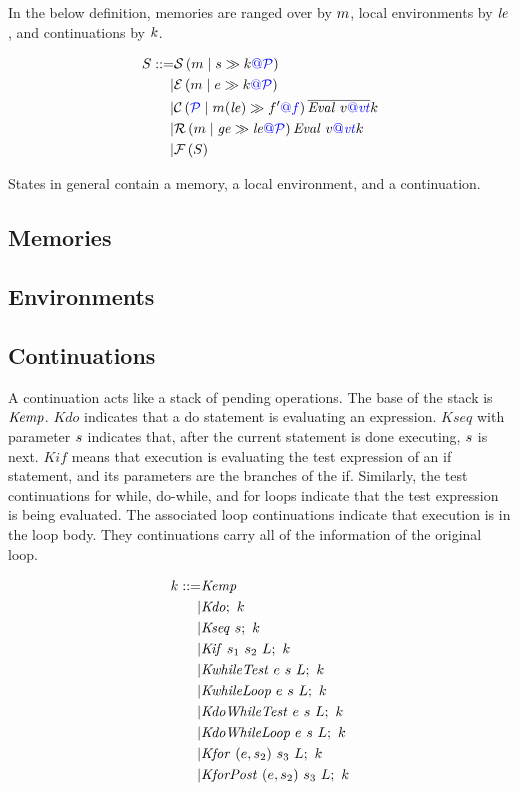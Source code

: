 \documentclass{llncs}
\begin{document}
\begin{table}[t]
In the below definition, memories are ranged over by \(\mem\), local environments by
\(\lenv\), and continuations by \(\cont\).

\[\begin{aligned}
S ::= & \sstate{\PCT}{\mem}{\stmt}{\cont} \\
| & \estate{\PCT}{\mem}{\expr}{\cont} \\
| & \cstate{f}{\PCT}{\mem}{\lenv}{f'}{\overline{\val{v}{\vt}}}{\cont} \\
| & \rstate{\PCT}{\mem}{\genv}{\lenv}{\val{v}{\vt}}{\cont} \\
| & \fstate{S} \\
\end{aligned}\]


States in general contain a memory, a local environment, and a continuation.

\subsection{Memories}

\subsection{Environments}

\subsection{Continuations}
\label{app:continuations}

A continuation acts like a stack of pending operations. The base of the stack is
\(\kemp\). \(\mathit{Kdo}\) indicates that a do statement is evaluating an expression.
\(\mathit{Kseq}\) with parameter \(\stmt\) indicates that, after the current statement
is done executing, \(\stmt\) is next. \(\mathit{Kif}\) means that execution is evaluating
the test expression of an if statement, and its parameters are the branches of the
if. Similarly, the test continuations for while, do-while, and for loops indicate that
the test expression is being evaluated. The associated loop continuations indicate that
execution is in the loop body. They continuations carry all of the information of the original
loop.

\[\begin{split}
\cont ::= & \kemp \\
| & \kdo{\cont} \\
| & \kseq{\stmt}{\cont} \\
| & \kif{\stmt_1}{\stmt_2}{L}{\cont} \\
| & \kwhiletest{\expr}{\stmt}{L}{\cont} \\
| & \kwhileloop{\expr}{\stmt}{L}{\cont} \\
| & \kdowhiletest{\expr}{\stmt}{L}{\cont} \\
| & \kdowhileloop{\expr}{\stmt}{L}{\cont} \\
| & \kfor{\expr}{\stmt_2}{\stmt_3}{L}{\cont} \\
| & \kforpost{\expr}{\stmt_2}{\stmt_3}{L}{\cont} \\
\end{split}\]



\end{table}
\end{document}

